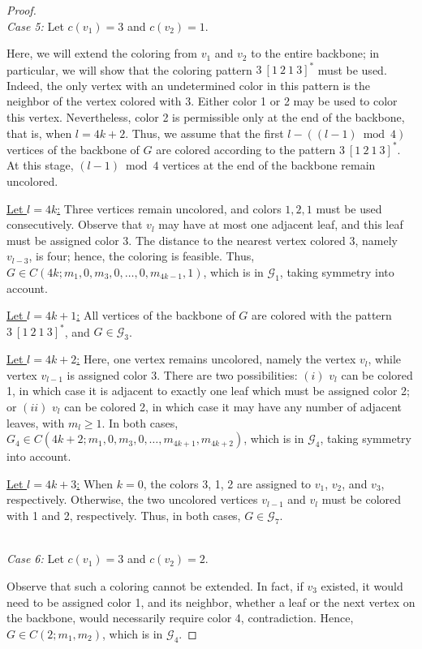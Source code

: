 \documentclass[10pt,a4paper]{amsart}
\begin{document}
\begin{proof}
~~\\
\emph{Case 5:} Let $c(v_1)=3$ and $c(v_2)=1$. 

Here, we will extend the coloring from $v_1$ and $v_2$ to the entire backbone; in particular, we will show that the coloring pattern $3\ [1\ 2\ 1\ 3]^*$ must be used. Indeed, the only vertex with an undetermined color in this pattern is the neighbor of the vertex colored with 3. Either color 1 or 2 may be used to color this vertex. Nevertheless, color 2 is permissible only at the end of the backbone, that is, when $l=4k+2$. Thus, we assume that the first $l-((l-1) \bmod 4)$ vertices of the backbone of $G$ are colored according to the pattern $3\ [1\ 2\ 1\ 3]^*$. At this stage, $(l-1)\bmod 4$ vertices at the end of the backbone remain uncolored.

\underline{Let $l=4k$:} 
Three vertices remain uncolored, and colors $1,2,1$ must be used consecutively. Observe that $v_l$ may have at most one adjacent leaf, and this leaf must be assigned color 3. The distance to the nearest vertex colored  3, namely $v_{l-3}$, is four; hence, the coloring is feasible. Thus, $G \in C(4k;m_1,0,m_3,0, \ldots, 0, m_{4k-1},1)$, which is in $\mathcal{G}_1$, taking symmetry into account.

\underline{Let $l=4k+1$:} 
All vertices of the backbone of $G$ are colored with the pattern $3\ [1\ 2\ 1\ 3]^*$, and $G \in \mathcal{G}_3$.

\underline{Let $l=4k+2$:} 
Here, one vertex remains uncolored, namely the vertex $v_l$, while vertex $v_{l-1}$ is assigned color 3. There are two possibilities: $(i)$ $v_l$ can be colored 1, in which case it is adjacent to exactly one leaf which must be assigned color 2; or $(ii)$ $v_l$ can be colored 2, in which case it may have any number of adjacent leaves, with $m_l \geq 1$. In both cases, $G_4\in C(4k+2; m_1,0,m_3,0,\ldots,m_{4k+1},m_{4k+2})$, which is in $\mathcal{G}_4$, taking symmetry into account.

\underline{Let $l=4k+3$:} When $k=0$, the colors 3, 1, 2 are assigned to $v_1$, $v_2$, and $v_3$, respectively. Otherwise, the two uncolored vertices $v_{l-1}$ and $v_l$ must be colored with 1 and 2, respectively. Thus, in both cases, $G \in \mathcal{G}_7$.

~~\\
\emph{Case 6:} Let $c(v_1)=3$ and $c(v_2)=2$. 

Observe that such a coloring cannot be extended. In fact, if $v_3$ existed, it would need to be assigned color 1, and its neighbor, whether a leaf or the next vertex on the backbone, would necessarily require color 4, contradiction. 
Hence, $G\in C(2; m_1,m_2)$, which is in $\mathcal{G}_4$.


\end{proof}
\end{document}
